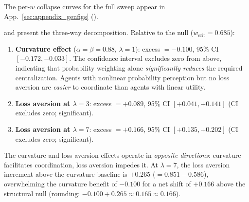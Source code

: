 \documentclass[letterpaper]{article}
\theoremstyle{plain}
\newcommand{\wcrit}{w_{\mathrm{crit}}}
\begin{document}
The per-$w$ collapse curves for the full sweep appear in App.~\ref{sec:appendix_genfigs} ().


 and  present the
three-way decomposition.
Relative to the null ($\wcrit = 0.685$):

\begin{enumerate}
  \item \textbf{Curvature effect} ($\alpha{=}\beta{=}0.88$, $\lambda{=}1$):
        excess $= -0.100$, 95\% CI $[-0.172, -0.033]$.
        The confidence interval excludes zero from above, indicating that
        probability weighting alone \emph{significantly reduces} the
        required centralization.
        Agents with nonlinear probability perception but no loss aversion
        are \emph{easier} to coordinate than agents with linear utility.

  \item \textbf{Loss aversion at $\lambda{=}3$}:
        excess $= +0.089$, 95\% CI $[+0.041, +0.141]$
        (CI excludes zero; significant).

  \item \textbf{Loss aversion at $\lambda{=}7$}:
        excess $= +0.166$, 95\% CI $[+0.135, +0.202]$
        (CI excludes zero; significant).
\end{enumerate}

The curvature and loss-aversion effects operate in \emph{opposite
directions}: curvature facilitates coordination, loss aversion impedes it.
At $\lambda{=}7$, the loss aversion increment above the curvature baseline
is $+0.265$ ($= 0.851 - 0.586$), overwhelming the curvature benefit
of $-0.100$ for a net shift of $+0.166$ above the structural null
(rounding: $-0.100 + 0.265 \approx 0.165 \approx 0.166$).
\end{document}
